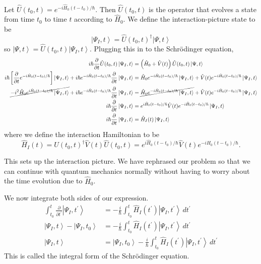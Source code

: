 \documentclass[11pt]{article}
\newcommand{\ket}[1]{\left|#1\right\rangle}
\newcommand{\op}[1]{\hat{#1}}
\theoremstyle{theorem}
\theoremstyle{remark}
\theoremstyle{step}
\theoremstyle{gap}
\begin{document}
Let \(\op{U}(t_0, t) = e^{-i\op{H}_0(t-t_0)/\hbar}\). Then \(\op{U}(t_0, t)\) is the operator that evolves a state from time \(t_0\) to time \(t\) according to \(\op{H}_0\). We define the interaction-picture state to be
\[\ket{\Psi_I, t} = \op{U}(t_0, t)^\dagger \ket{\Psi, t}\]
so \(\ket{\Psi, t} = \op{U}(t_0, t) \ket{\Psi_I, t}\).
Plugging this in to the Schr\"odinger equation,
\begin{align*}
i \hbar \frac{\partial}{\partial t} \op{U}(t_0, t)\ket{\Psi_I, t} &= \left(\op{H}_0 + \op{V}(t)\right) \op{U}(t_0, t)\ket{\Psi, t} \\
i \hbar \left[\frac{\partial}{\partial t} e^{-i\op{H}_0(t-t_0)/\hbar}\right] \ket{\Psi_I, t} + i \hbar e^{-i\op{H}_0(t-t_0)/\hbar} \frac{\partial}{\partial t} \ket{\Psi_I, t} &= \op{H}_0 e^{-i\op{H}_0(t-t_0)/\hbar}\ket{\Psi_I, t} + \op{V}(t) e^{-i\op{H}_0(t-t_0)/\hbar}\ket{\Psi_I, t} \\
\cancel{-i^2 \op{H}_0 e^{i\op{H}_0(t-t_0)/\hbar} \ket{\Psi_I, t}} + i \hbar e^{-i\op{H}_0(t-t_0)/\hbar} \frac{\partial}{\partial t} \ket{\Psi_I, t} &= \cancel{\op{H}_0 e^{-i\op{H}_0(t-t_0)/\hbar}\ket{\Psi_I, t}} + \op{V}(t) e^{-i\op{H}_0(t-t_0)/\hbar}\ket{\Psi_I, t} \\
 i \hbar \frac{\partial}{\partial t} \ket{\Psi_I, t} &= e^{i\op{H}_0(t-t_0)/\hbar}\op{V}(t) e^{-i\op{H}_0(t-t_0)/\hbar}\ket{\Psi_I, t} \\
 i \hbar \frac{\partial}{\partial t} \ket{\Psi_I, t} &= \op{H}_I(t)\ket{\Psi_I, t}
\end{align*}
where we define the interaction Hamiltonian to be
\[\op{H}_I(t) = \op{U}(t_0, t)^\dagger \op{V}(t)\op{U}(t_0, t) = e^{i\op{H}_0(t-t_0)/\hbar}\op{V}(t) e^{-i\op{H}_0(t-t_0)/\hbar}.\]

This sets up the interaction picture. We have rephrased our problem so that we can continue with quantum mechanics normally without having to worry about the time evolution due to \(\op{H}_0\).

We now integrate both sides of our expression.
\begin{align}
\int_{t_0}^t \frac{\partial}{\partial t^\prime} \ket{\Psi_I, t^\prime} &= -\frac{i}{\hbar} \int_{t_0}^t \op{H}_I(t^\prime)\ket{\Psi_I, t^\prime} \,dt^\prime \nonumber\\
\ket{\Psi_I, t} - \ket{\Psi_I, t_0} &= -\frac{i}{\hbar} \int_{t_0}^t \op{H}_I(t^\prime)\ket{\Psi_I, t^\prime} \,dt^\prime \nonumber\\
\ket{\Psi_I, t} &= \ket{\Psi_I, t_0} - \frac{i}{\hbar} \int_{t_0}^t \op{H}_I(t^\prime)\ket{\Psi_I, t^\prime} \,dt^\prime \label{eq.intse}
\end{align}
This is called the integral form of the Schr\"odinger equation.
\end{document}
